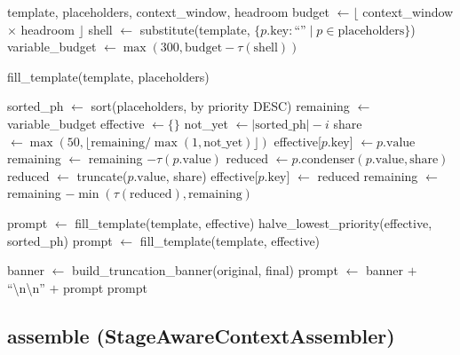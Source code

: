 \documentclass[11pt]{article}
\begin{document}
\begin{algorithm}[H]
\caption{ContextDecomposer prompt assembly}
\label{alg:assemble-prompt}
\begin{algorithmic}[1]
\REQUIRE template, placeholders, context\_window, headroom
\STATE budget $\leftarrow \lfloor$ context\_window $\times$ headroom $\rfloor$
\STATE shell $\leftarrow$ substitute(template, $\{p.\text{key}: \text{``''} \mid p \in \text{placeholders}\}$)
\STATE variable\_budget $\leftarrow \max(300, \text{budget} - \tau(\text{shell}))$

\STATE {}
  \RETURN fill\_template(template, placeholders)
\ENDIF

\STATE {}
\STATE sorted\_ph $\leftarrow$ sort(placeholders, by priority DESC)
\STATE remaining $\leftarrow$ variable\_budget
\STATE effective $\leftarrow \{\}$
  \STATE not\_yet $\leftarrow |\text{sorted\_ph}| - i$
  \STATE share $\leftarrow \max(50, \lfloor \text{remaining} / \max(1, \text{not\_yet}) \rfloor)$
    \STATE effective[$p.\text{key}$] $\leftarrow p.\text{value}$
    \STATE remaining $\leftarrow$ remaining $- \tau(p.\text{value})$
  \ELSE
      \STATE reduced $\leftarrow p.\text{condenser}(p.\text{value}, \text{share})$
    \ELSE
      \STATE reduced $\leftarrow$ truncate(${p.\text{value}}$, share)
    \ENDIF
    \STATE effective[$p.\text{key}$] $\leftarrow$ reduced
    \STATE remaining $\leftarrow$ remaining $- \min(\tau(\text{reduced}), \text{remaining})$
  \ENDIF
\ENDFOR

\STATE {}
\STATE prompt $\leftarrow$ fill\_template(template, effective)
  \STATE halve\_lowest\_priority(effective, sorted\_ph)
  \STATE prompt $\leftarrow$ fill\_template(template, effective)
\ENDWHILE

\STATE {}
\STATE banner $\leftarrow$ build\_truncation\_banner(original, final)
  \STATE prompt $\leftarrow$ banner $+$ ``\textbackslash n\textbackslash n'' $+$ prompt
\ENDIF
\RETURN prompt
\end{algorithmic}
\end{algorithm}

\subsection{assemble (StageAwareContextAssembler)}
\end{document}
